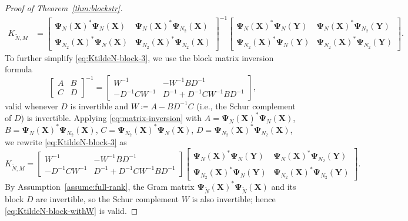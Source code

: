 \documentclass{article}
\theoremstyle{plain}
\theoremstyle{definition}
\def\X{\mathbf{X}}
\def\Y{\mathbf{Y}}
\newcommand{\arXivtag}[1][]{#1}
\begin{document}
\begin{proof}[Proof of Theorem~\ref{thm:blockstr}]
	\begin{align}
		K_{\tilde N, M}
		& = \begin{bmatrix}
			\mathbf{\Psi}_{N}(\X)^{*}\mathbf{\Psi}_{N}(\X) & \mathbf{\Psi}_{N}(\X)^{*}\arXivtag[\mathbf{\Psi}_{N_2}](\X) \\
			\arXivtag[\mathbf{\Psi}_{N_2}](\X)^{*}\mathbf{\Psi}_{N}(\X) & \arXivtag[\mathbf{\Psi}_{N_2}](\X)^{*}\arXivtag[\mathbf{\Psi}_{N_2}](\X)
		\end{bmatrix}^{-1}
		\begin{bmatrix}
			\mathbf{\Psi}_{N}(\X)^{*}\mathbf{\Psi}_{N}(\Y) & \mathbf{\Psi}_{N}(\X)^{*}\arXivtag[\mathbf{\Psi}_{N_2}](\Y) \\
			\arXivtag[\mathbf{\Psi}_{N_2}](\X)^{*}\mathbf{\Psi}_{N}(\Y) & \arXivtag[\mathbf{\Psi}_{N_2}](\X)^{*}\arXivtag[\mathbf{\Psi}_{N_2}](\Y)
		\end{bmatrix}.
		\label{eq:KtildeN-block-3}
	\end{align}
	To further simplify \eqref{eq:KtildeN-block-3}, we use the block matrix inversion formula
	\begin{equation}\label{eq:matrix-inversion}
		\begin{bmatrix}
			A & B \\
			C & D
		\end{bmatrix}^{-1}
		=
		\begin{bmatrix}
			W^{-1} & -W^{-1}BD^{-1}\\
			- D^{-1}C W^{-1} & D^{-1}+D^{-1}C W^{-1}BD^{-1}
		\end{bmatrix},
	\end{equation}
	valid whenever $D$ is invertible and $W\coloneqq A -BD^{-1}C$ (\arXivtag[i.e.,] the Schur complement of $D$) is invertible.
	Applying \eqref{eq:matrix-inversion} with $A=\mathbf{\Psi}_{N}(\X)^{*}\mathbf{\Psi}_{N}(\X)$, $B = \mathbf{\Psi}_{N}(\X)^{*}\arXivtag[\mathbf{\Psi}_{N_2}](\X)$, $C = \arXivtag[\mathbf{\Psi}_{N_2}](\X)^{*}\mathbf{\Psi}_{N}(\X)$, $D = \arXivtag[\mathbf{\Psi}_{N_2}](\X)^{*}\arXivtag[\mathbf{\Psi}_{N_2}](\X)$, we rewrite \eqref{eq:KtildeN-block-3} as
	\begin{equation}\label{eq:KtildeN-block-withW}
		K_{\tilde N, M} =
		\begin{bmatrix}
			W^{-1} & -W^{-1}BD^{-1}\\
			- D^{-1}C W^{-1} & D^{-1}+D^{-1}C W^{-1}BD^{-1}
		\end{bmatrix}
		\begin{bmatrix}
			\mathbf{\Psi}_{N}(\X)^{*}\mathbf{\Psi}_{N}(\Y) & \mathbf{\Psi}_{N}(\X)^{*}\arXivtag[\mathbf{\Psi}_{N_2}](\Y) \\
			\arXivtag[\mathbf{\Psi}_{N_2}](\X)^{*}\mathbf{\Psi}_{N}(\Y) & \arXivtag[\mathbf{\Psi}_{N_2}](\X)^{*}\arXivtag[\mathbf{\Psi}_{N_2}](\Y)
		\end{bmatrix}.
	\end{equation}
	By Assumption~\ref{assume:full-rank}, the Gram matrix $\mathbf{\Psi}_{\tilde N}(\X)^{*}\mathbf{\Psi}_{\tilde N}(\X)$ and its block $D$ are invertible, so the Schur complement $W$ is also invertible; hence \eqref{eq:KtildeN-block-withW} is valid.\arXivtag
	

\end{proof}
\end{document}
